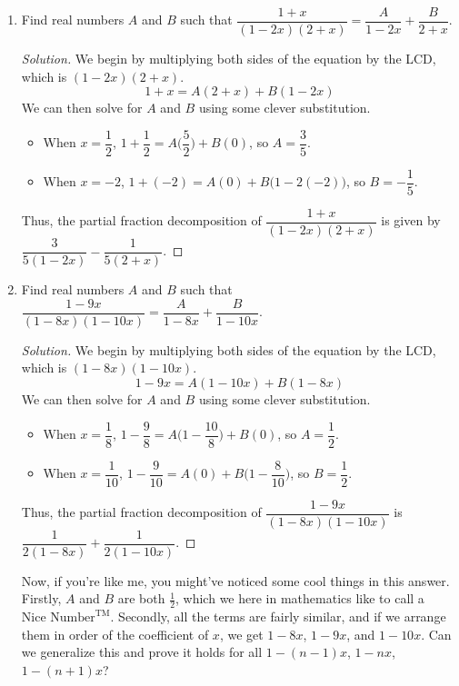 \documentclass{article}
\newenvironment{solution}
  {\renewcommand\qedsymbol{$\blacksquare$}\begin{proof}[Solution]}
  {\end{proof}}
\begin{document}
\begin{enumerate}
{\begin{minipage}[t]{.76\textwidth}
    \end{minipage}%
    }
    \item Find real numbers $A$ and $B$ such that $\dfrac{1+x}{(1-2x)(2+x)} = \dfrac{A}{1-2x} + \dfrac{B}{2+x}$.\begin{solution} 
        We begin by multiplying both sides of the equation by the LCD, which is $(1-2x)(2+x)$.\[
            1+x = A(2+x) + B(1-2x)    
        \] We can then solve for $A$ and $B$ using some clever substitution.\begin{itemize} 
            \item When $x=\dfrac{1}{2}$, $1 + \dfrac{1}{2} = A\bigg(\dfrac{5}{2}\bigg) + B(0)$, so $A=\dfrac{3}{5}$. 
            \item When $x=-2$, $1 + (-2) = A(0) + B\big(1-2(-2)\big)$, so $B = -\dfrac{1}{5}$. 
        \end{itemize} Thus, the partial fraction decomposition of $\dfrac{1+x}{(1-2x)(2+x)}$ is given by $\dfrac{3}{5(1-2x)} - \dfrac{1}{5(2+x)}$. 
    \end{solution} 
    \item Find real numbers $A$ and $B$ such that $\dfrac{1-9x}{(1-8x)(1-10x)} = \dfrac{A}{1-8x} + \dfrac{B}{1-10x}$.\begin{solution} 
        We begin by multiplying both sides of the equation by the LCD, which is $(1-8x)(1-10x)$.\[
            1-9x = A(1-10x) + B(1-8x)    
        \] We can then solve for $A$ and $B$ using some clever substitution.\begin{itemize}
            \item When $x=\dfrac{1}{8}$, $1-\dfrac{9}{8} = A\bigg(1-\dfrac{10}{8}\bigg) + B(0)$, so $A=\dfrac{1}{2}$. 
            \item When $x=\dfrac{1}{10}$, $1-\dfrac{9}{10} = A(0) + B\bigg(1-\dfrac{8}{10}\bigg)$, so $B=\dfrac{1}{2}$. 
        \end{itemize} Thus, the partial fraction decomposition of $\dfrac{1-9x}{(1-8x)(1-10x)}$ is $\dfrac{1}{2(1-8x)} + \dfrac{1}{2(1-10x)}$. 
    \end{solution}
    Now, if you're like me, you might've noticed some cool things in this answer. Firstly, $A$ and $B$ are both $\frac{1}{2}$, which we here in mathematics
    like to call a $\text{Nice Number}^{\text{TM}}$. Secondly, all the terms are fairly similar, and if we arrange them in order of the coefficient of $x$, we get 
    $1-8x$, $1-9x$, and $1-10x$. Can we generalize this and prove it holds for all $1-(n-1)x$, $1-nx$, $1-(n+1)x$?\par 

\end{enumerate}
\end{document}
